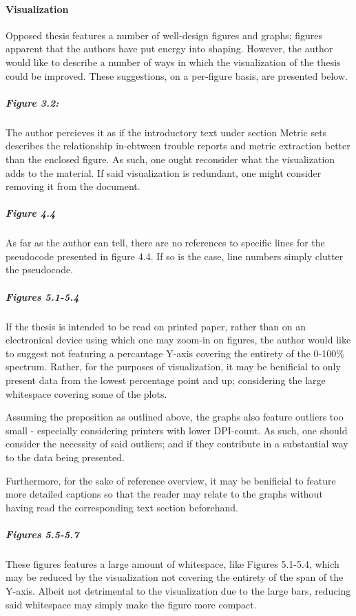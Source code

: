 
\paragraph{Visualization}
\label{par:visualization}
Opposed thesis features a number of well-design figures and graphs; figures apparent that the authors have put energy into shaping.
However, the author would like to describe a number of ways in which the visualization of the thesis could be improved.
These suggestions, on a per-figure basis, are presented below.

\subparagraph{Figure 3.2:}
\label{par:visualization_figurethreepointtwo}
The author percieves it as if the introductory text under section Metric sets describes the relationship in-ebtween trouble reports and metric extraction better than the enclosed figure.
As such, one ought reconsider what the visualization adds to the material.
If said visualization is redundant, one might consider removing it from the document.

\subparagraph{Figure 4.4}
\label{par:visualization_figurefourpointfour}
As far as the author can tell, there are no references to specific lines for the pseudocode presented in figure 4.4.
If so is the case, line numbers simply clutter the pseudocode.

\subparagraph{Figures 5.1-5.4}
\label{par:visualization_figuresfivepointonetofivepointfour}
If the thesis is intended to be read on printed paper, rather than on an electronical device using which one may zoom-in on figures, the author would like to suggest not featuring a percantage Y-axis covering the entirety of the 0-100\% spectrum.
Rather, for the purposes of visualization, it may be benificial to only present data from the lowest percentage point and up; considering the large whitespace covering some of the plots.

Assuming the preposition as outlined above, the graphs also feature outliers too small - especially considering printers with lower DPI-count.
As such, one should consider the necessity of said outliers; and if they contribute in a substantial way to the data being presented.

Furthermore, for the sake of reference overview, it may be benificial to feature more detailed captions so that the reader may relate to the graphs without having read the corresponding text section beforehand.

\subparagraph{Figures 5.5-5.7}
\label{par:visualization_figuresfivepointfivetofivepointseven}
These figures features a large amount of whitespace, like Figures 5.1-5.4, which may be reduced by the visualization not covering the entirety of the span of the Y-axis.
Albeit not detrimental to the visualization due to the large bars, reducing said whitespace may simply make the figure more compact.

